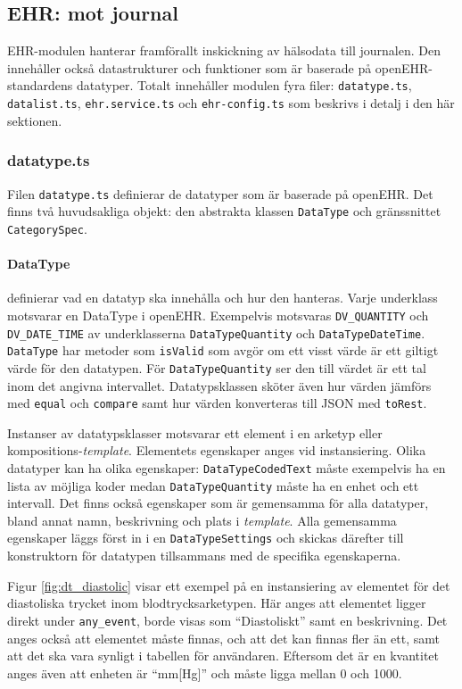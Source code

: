 \documentclass[techdoc/techdoc.tex]{subfiles}
\begin{document}
\subsection{EHR: mot journal}
EHR-modulen hanterar framförallt inskickning av hälsodata till journalen. Den
innehåller också datastrukturer och funktioner som är baserade på
openEHR-standardens datatyper. Totalt innehåller modulen fyra filer:
\texttt{datatype.ts}, \texttt{datalist.ts}, \texttt{ehr.service.ts} och
\texttt{ehr-config.ts} som beskrivs i detalj i den här sektionen.


\subsubsection{datatype.ts} \label{sec:sys-datatype}
Filen \texttt{datatype.ts} definierar de datatyper som är baserade på openEHR.
Det finns två huvudsakliga objekt: den abstrakta klassen \texttt{DataType} och
gränssnittet \texttt{CategorySpec}.

\paragraph{DataType} definierar vad en datatyp ska innehålla och hur den
hanteras. Varje underklass motsvarar en DataType i openEHR.  Exempelvis
motsvaras \texttt{DV\_QUANTITY} och \texttt{DV\_DATE\_TIME} av underklasserna
\texttt{DataTypeQuantity} och \texttt{DataTypeDateTime}.  \texttt{DataType} har
metoder som \texttt{isValid} som avgör om ett visst värde är ett giltigt värde
för den datatypen. För \texttt{DataTypeQuantity} ser den till värdet är ett tal
inom det angivna intervallet. Datatypsklassen sköter även hur värden jämförs
med \texttt{equal} och \texttt{compare} samt hur värden konverteras till JSON
med \texttt{toRest}.

Instanser av datatypsklasser motsvarar ett element i en arketyp eller
kompositions-\emph{template}. Elementets egenskaper anges vid instansiering. Olika
datatyper kan ha olika egenskaper: \texttt{DataTypeCodedText} måste exempelvis
ha en lista av möjliga koder medan \texttt{DataTypeQuantity} måste ha en enhet
och ett intervall. Det finns också egenskaper som är gemensamma för alla
datatyper, bland annat namn, beskrivning och plats i \emph{template}. Alla gemensamma
egenskaper läggs först in i en \texttt{DataTypeSettings} och skickas därefter
till konstruktorn för datatypen tillsammans med de specifika egenskaperna.

Figur \ref{fig:dt_diastolic} visar ett exempel på en instansiering av elementet
för det diastoliska trycket inom blodtrycksarketypen. Här anges att elementet
ligger direkt under \texttt{any\_event}, borde visas som ``Diastoliskt'' samt
en beskrivning. Det anges också att elementet måste finnas, och att det kan
finnas fler än ett, samt att det ska vara synligt i tabellen för användaren.
Eftersom det är en kvantitet anges även att enheten är ``mm[Hg]'' och måste
ligga mellan 0 och 1000.
\end{document}
